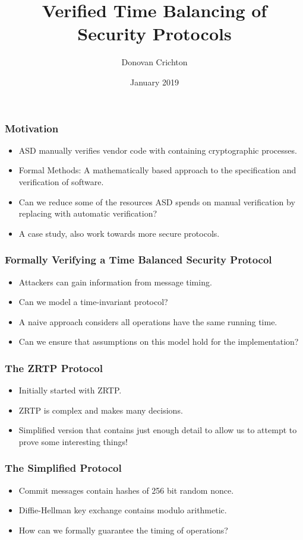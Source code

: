 \documentclass{beamer}
\title{Verified Time Balancing of Security Protocols}
\author{Donovan Crichton}
\date{January 2019}
\begin{document}
 
\frame{\titlepage}

\begin{frame}[fragile]
  \frametitle{Motivation}
  \begin{itemize}
    \item ASD manually verifies vendor code with containing 
          cryptographic processes.
    \item Formal Methods: A mathematically based approach to the
            specification and verification of software.
    \item Can we reduce some of the resources ASD spends on 
            manual verification by replacing with automatic 
            verification?
    \item A case study, also work towards more secure protocols.
  \end{itemize}
\end{frame}

\begin{frame}[fragile]
  \frametitle{Formally Verifying a Time Balanced Security Protocol}
  \begin{itemize}
    \item Attackers can gain information from message timing.
    \item Can we model a time-invariant protocol?
    \item A naive approach considers all operations have the 
          same running time.
    \item Can we ensure that assumptions on this model hold for the
            implementation?
  \end{itemize}
\end{frame}

\begin{frame}[fragile]
  \frametitle{The ZRTP Protocol}
  \begin{itemize}
    \item Initially started with ZRTP.
    \item ZRTP is complex and makes many decisions.
    \item Simplified version that contains just enough detail to 
            allow us to attempt to prove some interesting things!
  \end{itemize}
\end{frame}

\begin{frame}[fragile]
  \frametitle{The Simplified Protocol}
    \begin{itemize}
      \item Commit messages contain hashes of 256 bit random nonce.
      \item Diffie-Hellman key exchange contains modulo arithmetic.
      \item How can we formally guarantee the timing of operations?
    \end{itemize}
\end{frame}
\end{document}
